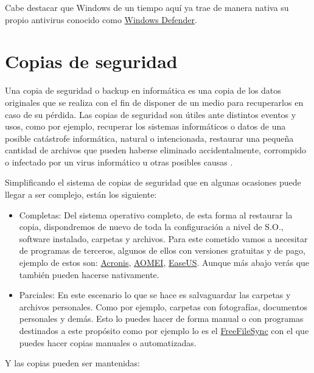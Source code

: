\documentclass[
  a4paper,
  openany]{book}
\begin{document}
Cabe destacar que Windows de un tiempo aquí ya trae de manera nativa su propio antivirus conocido como \href{https://www.microsoft.com/es-es/windows/comprehensive-security}{Windows Defender}.

\hypertarget{copias-de-seguridad}{%
\section{Copias de seguridad}\label{copias-de-seguridad}}

Una copia de seguridad o backup en informática es una copia de los datos originales que se realiza con el fin de disponer de un medio para recuperarlos en caso de su pérdida. Las copias de seguridad son útiles ante distintos eventos y usos, como por ejemplo, recuperar los sistemas informáticos o datos de una posible catástrofe informática, natural o intencionada, restaurar una pequeña cantidad de archivos que pueden haberse eliminado accidentalmente, corrompido o infectado por un virus informático u otras posibles causas \citep{WIKI-copias-seguridad}.

Simplificando el sistema de copias de seguridad que en algunas ocasiones puede llegar a ser complejo, están los siguiente:

\begin{itemize}
\item
  Completas: Del sistema operativo completo, de esta forma al restaurar la copia, dispondremos de nuevo de toda la configuración a nivel de S.O., software instalado, carpetas y archivos. Para este cometido vamos a necesitar de programas de terceros, algunos de ellos con versiones gratuitas y de pago, ejemplo de estos son: \href{https://www.acronis.com/}{Acronis}, \href{https://www.aomeitech.com/}{AOMEI}, \href{https://www.easeus.com/}{EaseUS}. Aunque más abajo verás que también pueden hacerse nativamente.
\item
  Parciales: En este escenario lo que se hace es salvaguardar las carpetas y archivos personales. Como por ejemplo, carpetas con fotografías, documentos personales y demás. Esto lo puedes hacer de forma manual o con programas destinados a este propósito como por ejemplo lo es el \href{https://freefilesync.org/}{FreeFileSync} con el que puedes hacer copias manuales o automatizadas.
\end{itemize}

Y las copias pueden ser mantenidas:
\end{document}
